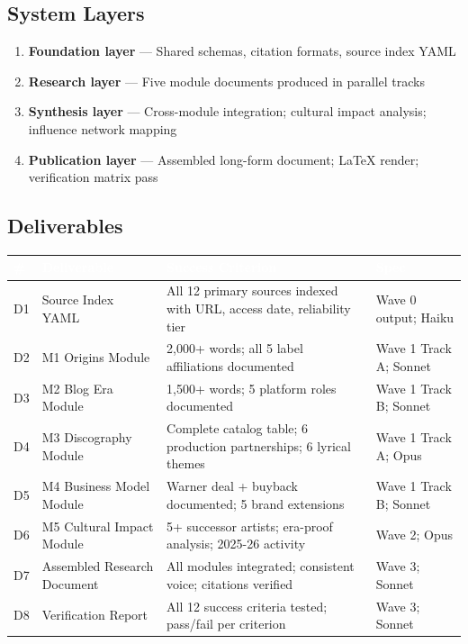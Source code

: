 \documentclass[11pt,letterpaper]{article}
\newcommand{\tableheader}[1]{\textbf{\sffamily\textcolor{white}{#1}}}
\begin{document}
\subsection{System Layers}

\begin{enumerate}
  \item \textbf{Foundation layer} — Shared schemas, citation formats, source index YAML
  \item \textbf{Research layer} — Five module documents produced in parallel tracks
  \item \textbf{Synthesis layer} — Cross-module integration; cultural impact analysis; influence network mapping
  \item \textbf{Publication layer} — Assembled long-form document; LaTeX render; verification matrix pass
\end{enumerate}

\subsection{Deliverables}

\begin{center}
\begin{tabularx}{\textwidth}{C{0.7cm}L{4cm}L{3cm}X}
\toprule
{}
\tableheader{\#} & \tableheader{Deliverable} & \tableheader{Success Criterion} & \tableheader{Spec} \\
\midrule
D1 & Source Index YAML & All 12 primary sources indexed with URL, access date, reliability tier & Wave 0 output; Haiku \\
D2 & M1 Origins Module & 2,000+ words; all 5 label affiliations documented & Wave 1 Track A; Sonnet \\
D3 & M2 Blog Era Module & 1,500+ words; 5 platform roles documented & Wave 1 Track B; Sonnet \\
D4 & M3 Discography Module & Complete catalog table; 6 production partnerships; 6 lyrical themes & Wave 1 Track A; Opus \\
D5 & M4 Business Model Module & Warner deal + buyback documented; 5 brand extensions & Wave 1 Track B; Sonnet \\
D6 & M5 Cultural Impact Module & 5+ successor artists; era-proof analysis; 2025-26 activity & Wave 2; Opus \\
D7 & Assembled Research Document & All modules integrated; consistent voice; citations verified & Wave 3; Sonnet \\
D8 & Verification Report & All 12 success criteria tested; pass/fail per criterion & Wave 3; Sonnet \\
\bottomrule
\end{tabularx}
\end{center}
\end{document}

